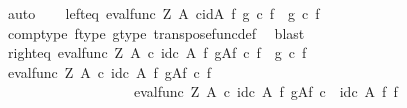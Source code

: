 \begin{isabellebody}
%
\isadelimproof
%
\endisadelimproof
%
\isatagproof
{}\isamarkupfalse%
\ auto\isanewline
\ \ \isamarkupfalse%
\ left{\isacharunderscore}{\kern0pt}eq{\isacharcolon}{\kern0pt}\ {\isachardoublequoteopen}{\isacharparenleft}{\kern0pt}eval{\isacharunderscore}{\kern0pt}func\ Z\ A{\isacharparenright}{\kern0pt}\ {\isasymcirc}\isactrlsub c{\isacharparenleft}{\kern0pt}id{\isacharparenleft}{\kern0pt}A{\isacharparenright}{\kern0pt}\ {\isasymtimes}\isactrlsub f\ {\isacharparenleft}{\kern0pt}g\ {\isasymcirc}\isactrlsub c\ f{\isacharparenright}{\kern0pt}\isactrlsup {\isasymsharp}{\isacharparenright}{\kern0pt}\ {\isacharequal}{\kern0pt}\ g\ {\isasymcirc}\isactrlsub c\ f{\isachardoublequoteclose}\isanewline
\ \ \ \ \isamarkupfalse%
\ comp{\isacharunderscore}{\kern0pt}type\ f{\isacharunderscore}{\kern0pt}type\ g{\isacharunderscore}{\kern0pt}type\ transpose{\isacharunderscore}{\kern0pt}func{\isacharunderscore}{\kern0pt}def\ \isamarkupfalse%
\ blast\isanewline
\ \ \isamarkupfalse%
\ right{\isacharunderscore}{\kern0pt}eq{\isacharcolon}{\kern0pt}\ {\isachardoublequoteopen}{\isacharparenleft}{\kern0pt}eval{\isacharunderscore}{\kern0pt}func\ Z\ A{\isacharparenright}{\kern0pt}\ {\isasymcirc}\isactrlsub c\ {\isacharparenleft}{\kern0pt}id\isactrlsub c\ A\ {\isasymtimes}\isactrlsub f\ {\isacharparenleft}{\kern0pt}g\isactrlbsup A\isactrlesup \isactrlsub f\ {\isasymcirc}\isactrlsub c\ f\isactrlsup {\isasymsharp}{\isacharparenright}{\kern0pt}{\isacharparenright}{\kern0pt}\ {\isacharequal}{\kern0pt}\ g\ {\isasymcirc}\isactrlsub c\ f{\isachardoublequoteclose}\isanewline
\ \ \isamarkupfalse%
\ {\isacharminus}{\kern0pt}\ \isanewline
\ \ \ \ \isamarkupfalse%
\ {\isachardoublequoteopen}{\isacharparenleft}{\kern0pt}eval{\isacharunderscore}{\kern0pt}func\ Z\ A{\isacharparenright}{\kern0pt}\ {\isasymcirc}\isactrlsub c\ {\isacharparenleft}{\kern0pt}id\isactrlsub c\ A\ {\isasymtimes}\isactrlsub f\ {\isacharparenleft}{\kern0pt}g\isactrlbsup A\isactrlesup \isactrlsub f\ {\isasymcirc}\isactrlsub c\ f\isactrlsup {\isasymsharp}{\isacharparenright}{\kern0pt}{\isacharparenright}{\kern0pt}\ {\isacharequal}{\kern0pt}\isanewline
\ \ \ \ \ \ \ \ \ \ \ \ \ \ \ \ \ \ \ {\isacharparenleft}{\kern0pt}eval{\isacharunderscore}{\kern0pt}func\ Z\ A{\isacharparenright}{\kern0pt}\ {\isasymcirc}\isactrlsub c\ {\isacharparenleft}{\kern0pt}{\isacharparenleft}{\kern0pt}id\isactrlsub c\ A\ {\isasymtimes}\isactrlsub f\ {\isacharparenleft}{\kern0pt}g\isactrlbsup A\isactrlesup \isactrlsub f{\isacharparenright}{\kern0pt}{\isacharparenright}{\kern0pt}\ {\isasymcirc}\isactrlsub c\ \ {\isacharparenleft}{\kern0pt}id\isactrlsub c\ A\ {\isasymtimes}\isactrlsub f\ f\isactrlsup {\isasymsharp}{\isacharparenright}{\kern0pt}{\isacharparenright}{\kern0pt}{\isachardoublequoteclose}\isanewline

\end{isabellebody}

